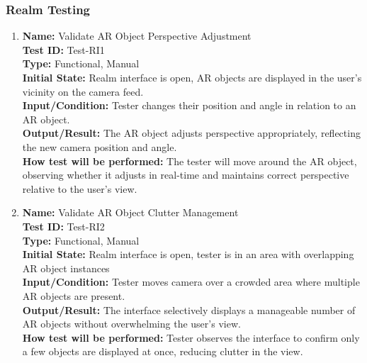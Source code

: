 \documentclass[12pt, titlepage]{article}
\begin{document}
\subsubsection{Realm Testing}

\begin{enumerate}


  \item \textbf{Name:} Validate AR Object Perspective Adjustment \label{itm:Test-RI1} \\
        \textbf{Test ID:} Test-RI1 \\
        \textbf{Type:} Functional, Manual \\
        \textbf{Initial State:} Realm interface is open, AR objects are displayed in the user's vicinity on the camera feed. \\
        \textbf{Input/Condition:} Tester changes their position and angle in relation to an AR object. \\
        \textbf{Output/Result:} The AR object adjusts perspective appropriately, reflecting the new camera position and angle. \\ \textbf{How test will be performed:} The tester will move around the AR object, observing whether it adjusts in real-time and maintains correct perspective relative to the user's view.

  \item \textbf{Name:} Validate AR Object Clutter Management \label{itm:Test-RI2} \\
        \textbf{Test ID:} Test-RI2 \\
        \textbf{Type:} Functional, Manual \\
        \textbf{Initial State:} Realm interface is open, tester is in an area with overlapping AR object instances \\
        \textbf{Input/Condition:} Tester moves camera over a crowded area where multiple AR objects are present. \\
        \textbf{Output/Result:} The interface selectively displays a manageable number of AR objects without overwhelming the user's view. \\ \textbf{How test will be performed:} Tester observes the interface to confirm only a few objects are displayed at once, reducing clutter in the view.


\end{enumerate}
\end{document}
